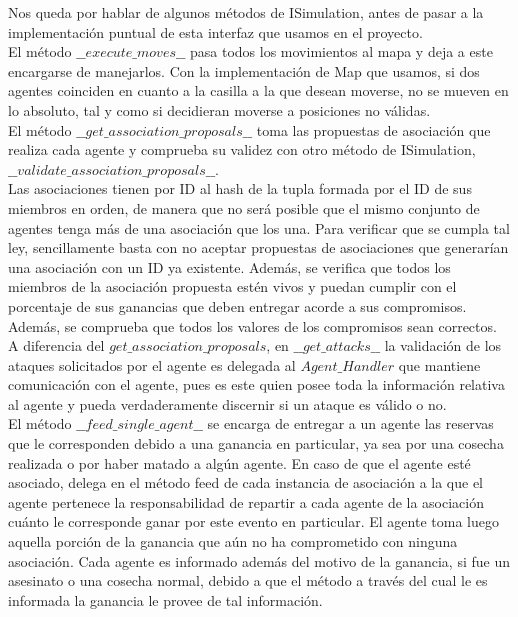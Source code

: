 \documentclass[11pt]{article}
\begin{document}
Nos queda por hablar de algunos métodos de ISimulation, antes de pasar a la implementación puntual de esta interfaz que usamos en el proyecto.\\
El método $\_\_execute\_moves\_\_$ pasa todos los movimientos al mapa y deja a este encargarse de manejarlos. Con la implementación de Map que usamos, si dos agentes coinciden en cuanto a la casilla a la que desean moverse, no se mueven en lo absoluto, tal y como si decidieran moverse a posiciones no válidas.\\
El método $\_\_get\_association\_proposals\_\_$ toma las propuestas de asociación que realiza cada agente y comprueba su validez con otro método de ISimulation, $\_\_validate\_association\_proposals\_\_$.\\
Las asociaciones tienen por ID al hash de la tupla formada por el ID de sus miembros en orden, de manera que no será posible que el mismo conjunto de agentes tenga más de una asociación que los una. Para verificar que se cumpla tal ley, sencillamente basta con no aceptar propuestas de asociaciones que generarían una asociación con un ID ya existente. Además, se verifica que todos los miembros de la asociación propuesta estén vivos y puedan cumplir con el porcentaje de sus ganancias que deben entregar acorde a sus compromisos. Además, se comprueba que todos los valores de los compromisos sean correctos.\\
A diferencia del $get\_association\_proposals$, en $\_\_get\_attacks\_\_$ la validación de los ataques solicitados por el agente es delegada al $Agent\_Handler$ que mantiene comunicación con el agente, pues es este quien posee toda la información relativa al agente y pueda verdaderamente discernir si un ataque es válido o no.\\
El método $\_\_feed\_single\_agent\_\_$ se encarga de entregar a un agente las reservas que le corresponden debido a una ganancia en particular, ya sea por una cosecha realizada o por haber matado a algún agente. En caso de que el agente esté asociado, delega en el método feed de cada instancia de asociación a la que el agente pertenece la responsabilidad de repartir a cada agente de la asociación cuánto le corresponde ganar por este evento en particular. El agente toma luego aquella porción de la ganancia que aún no ha comprometido con ninguna asociación. Cada agente es informado además del motivo de la ganancia, si fue un asesinato o una cosecha normal, debido a que el método a través del cual le es informada la ganancia le provee de tal información.\\
\end{document}
